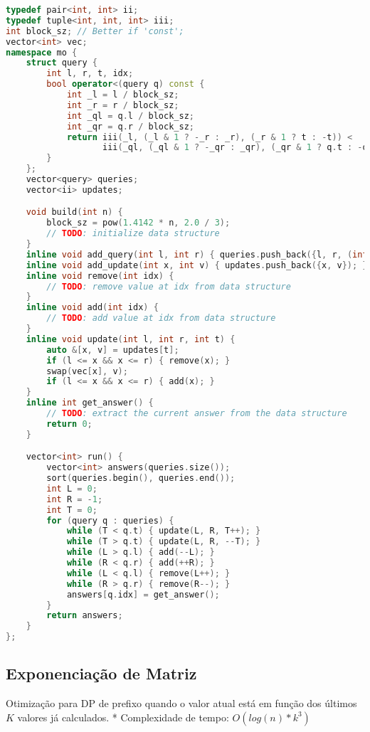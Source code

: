 \documentclass[11pt, a4paper, twoside]{article}
\begin{document}
\begin{lstlisting}[language=C++]
typedef pair<int, int> ii;
typedef tuple<int, int, int> iii;
int block_sz; // Better if 'const';
vector<int> vec;
namespace mo {
    struct query {
        int l, r, t, idx;
        bool operator<(query q) const {
            int _l = l / block_sz;
            int _r = r / block_sz;
            int _ql = q.l / block_sz;
            int _qr = q.r / block_sz;
            return iii(_l, (_l & 1 ? -_r : _r), (_r & 1 ? t : -t)) <
                   iii(_ql, (_ql & 1 ? -_qr : _qr), (_qr & 1 ? q.t : -q.t));
        }
    };
    vector<query> queries;
    vector<ii> updates;

    void build(int n) {
        block_sz = pow(1.4142 * n, 2.0 / 3);
        // TODO: initialize data structure
    }
    inline void add_query(int l, int r) { queries.push_back({l, r, (int)updates.size(), (int)queries.size()}); }
    inline void add_update(int x, int v) { updates.push_back({x, v}); }
    inline void remove(int idx) {
        // TODO: remove value at idx from data structure
    }
    inline void add(int idx) {
        // TODO: add value at idx from data structure
    }
    inline void update(int l, int r, int t) {
        auto &[x, v] = updates[t];
        if (l <= x && x <= r) { remove(x); }
        swap(vec[x], v);
        if (l <= x && x <= r) { add(x); }
    }
    inline int get_answer() {
        // TODO: extract the current answer from the data structure
        return 0;
    }

    vector<int> run() {
        vector<int> answers(queries.size());
        sort(queries.begin(), queries.end());
        int L = 0;
        int R = -1;
        int T = 0;
        for (query q : queries) {
            while (T < q.t) { update(L, R, T++); }
            while (T > q.t) { update(L, R, --T); }
            while (L > q.l) { add(--L); }
            while (R < q.r) { add(++R); }
            while (L < q.l) { remove(L++); }
            while (R > q.r) { remove(R--); }
            answers[q.idx] = get_answer();
        }
        return answers;
    }
};
\end{lstlisting}

\subsection{Exponenciação de Matriz}



Otimização para DP de prefixo quando o valor atual está em função dos últimos $K$ valores já calculados.   
* Complexidade de tempo: $O(log(n)*k^3)$
\end{document}
